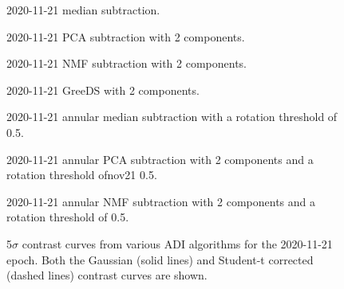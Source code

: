 
\begin{figure}[h!]
    \centering
    \caption{2020-11-21 median subtraction.}
\end{figure}

\begin{figure}[h!]
    \centering
    \caption{2020-11-21 PCA subtraction with 2 components.}
\end{figure}

\begin{figure}[h!]
    \centering
    \caption{2020-11-21 NMF subtraction with 2 components.}
\end{figure}

\begin{figure}[h!]
    \centering
    \caption{2020-11-21 GreeDS with 2 components.}
\end{figure}

\begin{figure}[h!]
    \centering
    \caption{2020-11-21 annular median subtraction with a rotation threshold of 0.5.}
\end{figure}

\begin{figure}[h!]
    \centering
    \caption{2020-11-21 annular PCA subtraction with 2 components and a rotation threshold ofnov21 0.5.}
\end{figure}

\begin{figure}[h!]
    \centering
    \caption{2020-11-21 annular NMF subtraction with 2 components and a rotation threshold of 0.5.}
\end{figure}

\begin{figure}[h!]
    \centering
    \caption{5$\sigma$ contrast curves from various ADI algorithms for the 2020-11-21 epoch. Both the Gaussian (solid lines) and Student-t corrected (dashed lines) contrast curves are shown.}
\end{figure}



